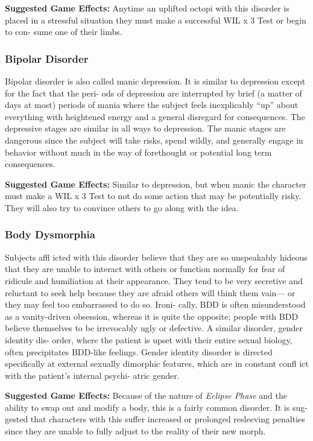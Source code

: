 \textbf{Suggested Game Effects: }Anytime an uplifted octopi 
with this disorder is placed in a stressful situation they 
must make a successful WIL x 3 Test or begin to con-
sume one of their limbs.

\subsubsection{Bipolar Disorder}

Bipolar disorder is also called manic depression. It is 
similar to depression except for the fact that the peri-
ods of depression are interrupted by brief (a matter of 
days at most) periods of mania where the subject feels 
inexplicably ``up'' about everything with heightened 
energy and a general disregard for consequences. The 
depressive stages are similar in all ways to depression. 
The manic stages are dangerous since the subject 
will take risks, spend wildly, and generally engage in 
behavior without much in the way of forethought or 
potential long term consequences.

\textbf{Suggested Game Effects: }Similar to depression, but 
when manic the character must make a WIL x 3 Test 
to not do some action that may be potentially risky. 
They will also try to convince others to go along with 
the idea.

\subsubsection{Body Dysmorphia}

Subjects affl icted with this disorder believe that they 
are so unspeakably hideous that they are unable to 
interact with others or function normally for fear of 
ridicule and humiliation at their appearance. They 
tend to be very secretive and reluctant to seek help 
because they are afraid others will think them vain—
or they may feel too embarrassed to do so. Ironi-
cally, BDD is often misunderstood as a vanity-driven 
obsession, whereas it is quite the opposite; people 
with BDD believe themselves to be irrevocably ugly 
or defective. A similar disorder, gender identity dis-
order, where the patient is upset with their entire 
sexual biology, often precipitates BDD-like feelings. 
Gender identity disorder is directed specifically  at 
external sexually dimorphic features, which are in 
constant confl ict with the patient's internal psychi-
atric gender.

\textbf{Suggested Game Effects: }Because of the nature of 
\textit{Eclipse Phase} and the ability to swap out and modify 
a body, this is a fairly common disorder. It is sug-
gested that characters with this suffer increased or 
prolonged resleeving penalties since they are unable 
to fully adjust to the reality of their new morph.

